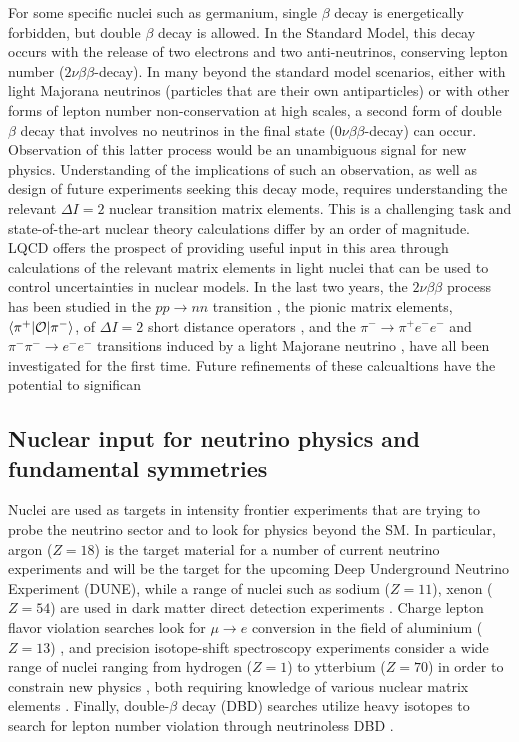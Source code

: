 For some specific nuclei such as germanium, single $\beta$ decay is energetically forbidden, but double $\beta$ decay is allowed. In the Standard Model, this decay occurs with the release of two electrons and two anti-neutrinos, conserving lepton number  ($2\nu\beta\beta$-decay). In many beyond the standard model scenarios, either with light Majorana neutrinos (particles that are their own antiparticles) or with other forms of lepton number non-conservation at high scales,  a second form of  double $\beta$ decay that involves no neutrinos in the final state ($0\nu\beta\beta$-decay) can occur. Observation of this latter process would be an unambiguous signal for new physics. Understanding of the implications of such an observation, as well as design of future experiments seeking this decay mode, requires understanding the relevant $\Delta I=2$ nuclear transition matrix elements. This is a challenging task and state-of-the-art nuclear theory calculations differ by an order of magnitude. LQCD offers the prospect of providing useful input in this area through calculations of the relevant matrix elements in light nuclei that can be used to control uncertainties in nuclear models. In the last two years, the $2\nu\beta\beta$ process has been studied in the $pp\to nn$ transition \cite{Tiburzi:2017iux,Shanahan:2017bgi},  the pionic matrix elements, $\langle \pi^+ | {\cal O} | \pi^- \rangle$, of $\Delta I =2$ short distance operators \cite{Nicholson:2018mwc}, and the $\pi^-\to \pi^+ e^- e^-$ and $\pi^-\pi^-\to e^-e^-$ transitions induced  by a light Majorane neutrino \cite{Feng:2018pdq,Murphy2018ICHEP}, have all been investigated for the first time. Future refinements of these calcualtions have the potential to significan




\subsection{Nuclear input for neutrino physics and fundamental symmetries}


Nuclei are used as targets in intensity frontier experiments that are trying to probe the neutrino sector and to look for physics beyond the SM. In particular, argon ($Z=18$) is the target material for a number of current neutrino experiments and will be the target for the upcoming Deep Underground Neutrino Experiment (DUNE), while a range of nuclei such as sodium ($Z=11$), xenon ($Z=54$) are used in dark matter direct detection experiments \cite{Undagoitia:2015gya}. Charge lepton flavor violation searches look for $\mu\to e$ conversion in the field of aluminium ($Z=13$) \cite{Albrecht:2013wet}, and precision isotope-shift spectroscopy experiments consider a wide range of nuclei ranging from hydrogen ($Z=1$) to ytterbium ($Z=70$) in  order to constrain new physics \cite{Delaunay:2016brc,Delaunay:2017dku}, both requiring knowledge of various nuclear matrix elements \cite{Chang:2017eiq}. Finally, double-$\beta$ decay (DBD) searches utilize heavy isotopes to search for lepton number violation through neutrinoless DBD \cite{DellOro:2016tmg,Engel:2016xgb,Nicholson:2016byl,Shanahan:2017bgi,Tiburzi:2017iux}.

